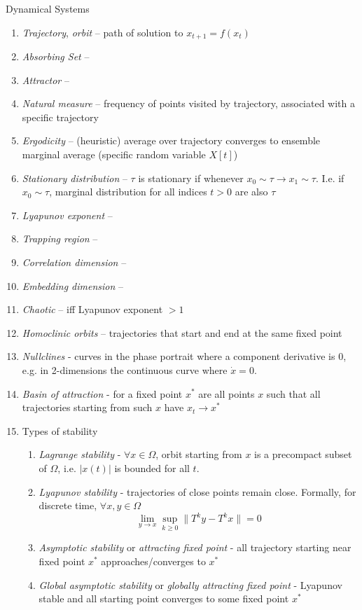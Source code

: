 \documentclass{article}
\begin{document}
\begin{section}{Dynamical Systems}
\begin{enumerate}
\item \emph{Trajectory}, \emph{orbit} -- path of solution to $x_{t+1} = f(x_t)$
\item \emph{Absorbing Set} --
\item \emph{Attractor} --
\item \emph{Natural measure} -- frequency of points visited by trajectory,
      associated with a specific trajectory
\item \emph{Ergodicity} -- (heuristic) average over trajectory converges to
      ensemble marginal average (specific random variable $X[t]$)
\item \emph{Stationary distribution} -- $\tau$ is stationary if whenever
      $x_0 \sim \tau \to x_1 \sim \tau$. I.e. if $x_0 \sim \tau$, marginal
      distribution for all indices $t > 0$ are also $\tau$
\item \emph{Lyapunov exponent} -- 
\item \emph{Trapping region} --
\item \emph{Correlation dimension} --
\item \emph{Embedding dimension} --
\item \emph{Chaotic} -- iff Lyapunov exponent $> 1$
\item \emph{Homoclinic orbits} -- trajectories that start and end at the same
      fixed point
\item \emph{Nullclines} - curves in the phase portrait where a component 
      derivative is 0, e.g. in 2-dimensions the continuous curve where
      $\dot{x} = 0$.
\item \emph{Basin of attraction} - for a fixed point $x^*$ are all points
      $x$ such that all trajectories starting from such $x$ have $x_t \to x^*$
\item Types of stability
      \begin{enumerate}
      \item \emph{Lagrange stability} - $\forall x \in \Omega$, orbit starting
      from $x$ is a precompact subset of $\Omega$, i.e. $|x(t)|$ is bounded
      for all $t$.
      \item \emph{Lyapunov stability} - trajectories of close points remain
      close. Formally, for discrete time, $\forall x, y \in \Omega$
      \[ \lim_{y \to x} \sup_{k \geq 0} \| T^k y - T^k x \| = 0 \]
      \item \emph{Asymptotic stability} or \emph{attracting fixed point} - 
      all trajectory starting near fixed point $x^*$ approaches/converges
      to $x^*$
      \item \emph{Global asymptotic stability} or \emph{globally attracting
      fixed point} - Lyapunov stable and all starting point converges to
      some fixed point $x^*$
      \end{enumerate}
\end{enumerate}
\end{section}
\end{document}
